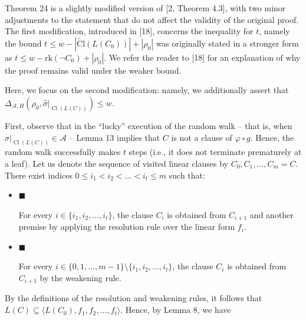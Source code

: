 \documentclass[10pt,a4paper]{article}
\begin{document}
Theorem 24 is a slightly modified version of [2, Theorem 4.3],
with two minor adjustments to the statement that do not affect the validity of the original proof.
The first modification, introduced in [18], concerns the inequality for $t$, namely the bound
$t\leq w-|\operatorname{\widetilde{Cl}}(L(C_{0}))|+|\rho_{0}|$ was originally stated in a stronger form as
$t\leq w-\mathrm{rk}{(\lnot C_{0})}+|\rho_{0}|$.
We refer the reader to [18] for an explanation of why the proof remains valid under the weaker bound.\par



Here, we focus on the second modification: namely, we additionally assert that
$\Delta_{\mathcal{A},H}(\rho_{0},\hat{\sigma}|_{\operatorname{Cl}(L(C))})\leq w$.\par



First, observe that in the “lucky” execution of the random walk – that is, when
$\hat{\sigma}|_{\operatorname{Cl}(L(C))}\in\mathcal{A}$ – Lemma 13 implies that $C$ is not a clause of $\varphi\circ g$.
Hence, the random walk successfully makes $t$ steps (i.e., it does not terminate prematurely at a leaf).
Let us denote the sequence of visited linear clauses by $C_{0},C_{1},\dots,C_{m}=C$.
There exist indices $0\leq i_{1}<i_{2}<\dots<i_{t}\leq m$ such that:\par


\begin{itemize}


\item 
$\blacksquare$ 


For every $i\in\{i_{1},i_{2},\dots,i_{t}\}$, the clause $C_{i}$ is obtained from $C_{i+1}$ and
another premise by applying the resolution rule over the linear form $f_{i}$.\par





\item 
$\blacksquare$ 


For every $i\in\{0,1,\dots,m-1\}\setminus\{i_{1},i_{2},\dots,i_{t}\}$,
the clause $C_{i}$ is obtained from $C_{i+1}$ by the weakening rule.\par





\end{itemize}


By the definitions of the resolution and weakening rules, it follows that
$L(C)\subseteq\langle L(C_{0}),f_{1},f_{2},\dots,f_{t}\rangle$. Hence, by Lemma 8, we have\par
\end{document}
